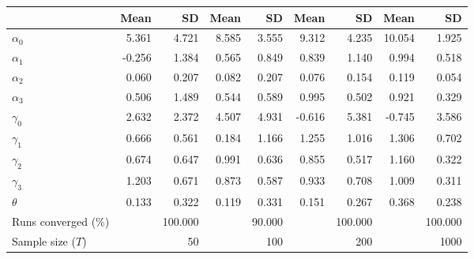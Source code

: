 
\begin{tabular}[t]{lrrrrrrrr}
\toprule
  & Mean & SD & Mean  & SD  & Mean   & SD   & Mean    & SD   \\
\midrule
$\alpha_{0}$ & 5.361 & 4.721 & 8.585 & 3.555 & 9.312 & 4.235 & 10.054 & 1.925\\
$\alpha_{1}$ & -0.256 & 1.384 & 0.565 & 0.849 & 0.839 & 1.140 & 0.994 & 0.518\\
$\alpha_{2}$ & 0.060 & 0.207 & 0.082 & 0.207 & 0.076 & 0.154 & 0.119 & 0.054\\
$\alpha_{3}$ & 0.506 & 1.489 & 0.544 & 0.589 & 0.995 & 0.502 & 0.921 & 0.329\\
$\gamma_{0}$ & 2.632 & 2.372 & 4.507 & 4.931 & -0.616 & 5.381 & -0.745 & 3.586\\
$\gamma_{1}$ & 0.666 & 0.561 & 0.184 & 1.166 & 1.255 & 1.016 & 1.306 & 0.702\\
$\gamma_{2}$ & 0.674 & 0.647 & 0.991 & 0.636 & 0.855 & 0.517 & 1.160 & 0.322\\
$\gamma_{3}$ & 1.203 & 0.671 & 0.873 & 0.587 & 0.933 & 0.708 & 1.009 & 0.311\\
$\theta$ & 0.133 & 0.322 & 0.119 & 0.331 & 0.151 & 0.267 & 0.368 & 0.238\\
Runs converged (\%) &  & 100.000 &  & 90.000 &  & 100.000 &  & 100.000\\
Sample size ($T$) &  & 50 &  & 100 &  & 200 &  & 1000\\
\bottomrule
\end{tabular}
